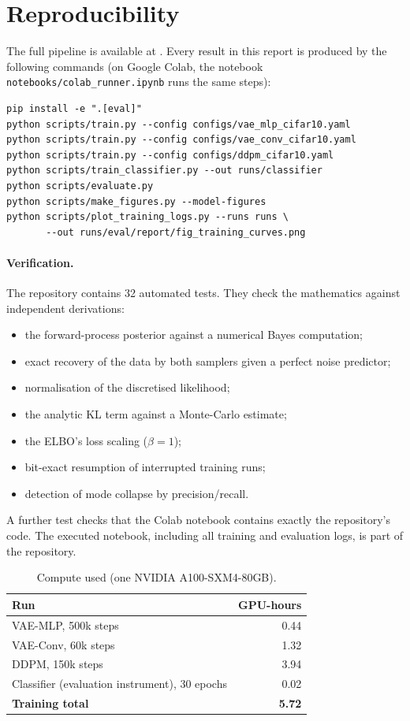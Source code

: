 \section{Reproducibility}
\label{app:repro}

The full pipeline is available at \repo. Every result in this report is produced by the following commands
(on Google Colab, the notebook \texttt{notebooks/colab\_runner.ipynb} runs the same steps):
\begin{verbatim}
pip install -e ".[eval]"
python scripts/train.py --config configs/vae_mlp_cifar10.yaml
python scripts/train.py --config configs/vae_conv_cifar10.yaml
python scripts/train.py --config configs/ddpm_cifar10.yaml
python scripts/train_classifier.py --out runs/classifier
python scripts/evaluate.py
python scripts/make_figures.py --model-figures
python scripts/plot_training_logs.py --runs runs \
       --out runs/eval/report/fig_training_curves.png
\end{verbatim}

\paragraph{Verification.} The repository contains 32 automated tests. They check the mathematics against
independent derivations:
\begin{itemize}
  \item the forward-process posterior against a numerical Bayes computation;
  \item exact recovery of the data by both samplers given a perfect noise predictor;
  \item normalisation of the discretised likelihood;
  \item the analytic KL term against a Monte-Carlo estimate;
  \item the ELBO's loss scaling ($\beta=1$);
  \item bit-exact resumption of interrupted training runs;
  \item detection of mode collapse by precision/recall.
\end{itemize}
A further test checks that the Colab notebook contains exactly the repository's code. The executed notebook,
including all training and evaluation logs, is part of the repository.

\begin{table}[H]
\centering\small
\caption{Compute used (one NVIDIA A100-SXM4-80GB).}
\begin{tabular}{@{}lr@{}}
\toprule
Run & GPU-hours\\
\midrule
VAE-MLP, 500k steps & 0.44\\
VAE-Conv, 60k steps & 1.32\\
DDPM, 150k steps & 3.94\\
Classifier (evaluation instrument), 30 epochs & 0.02\\
\midrule
\textbf{Training total} & \textbf{5.72}\\
\bottomrule
\end{tabular}
\end{table}
